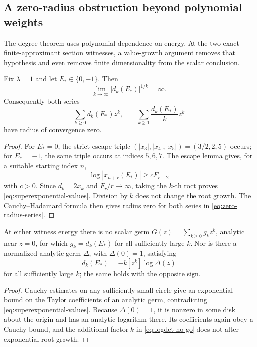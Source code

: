 \subsection{A zero-radius obstruction beyond polynomial weights}

The degree theorem uses polynomial dependence on energy.  At the two exact
finite-approximant section witnesses, a value-growth argument removes that
hypothesis and even
removes finite dimensionality from the scalar conclusion.

\begin{theorem}
Fix \(\lambda=1\) and let \(E_*\in\{0,-1\}\).  Then
\begin{equation}
\lim_{k\to\infty}|d_k(E_*)|^{1/k}=\infty.
\label{eq:superexponential-values}
\end{equation}
Consequently both series
\begin{equation}
\sum_{k\ge0}d_k(E_*)z^k,
\qquad
\sum_{k\ge1}\frac{d_k(E_*)}{k}z^k
\label{eq:zero-radius-series}
\end{equation}
have radius of convergence zero.
\end{theorem}

\begin{proof}
For \(E_*=0\), the strict escape triple
\((|x_3|,|x_4|,|x_5|)=(3/2,2,5)\) occurs; for \(E_*=-1\), the same triple
occurs at indices \(5,6,7\).  The escape lemma gives, for a suitable starting
index \(n\),
\[
\log|x_{n+r}(E_*)|\ge cF_{r+2}
\]
with \(c>0\).  Since \(d_k=2x_k\) and
\(F_r/r\to\infty\), taking the \(k\)-th root proves
\eqref{eq:superexponential-values}.  Division by \(k\) does not change the
root growth.  The Cauchy--Hadamard formula then gives radius zero for both
series in \eqref{eq:zero-radius-series}.
\end{proof}

\begin{corollary}
At either witness energy there is no scalar germ
\(G(z)=\sum_{k\ge0}g_kz^k\), analytic near \(z=0\), for which
\(g_k=d_k(E_*)\) for all sufficiently large \(k\).  Nor is there a normalized
analytic germ \(\Delta\), with \(\Delta(0)=1\), satisfying
\begin{equation}
d_k(E_*)=-k[z^k]\log\Delta(z)
\label{eq:logdet-no-go}
\end{equation}
for all sufficiently large \(k\); the same holds with the opposite sign.
\end{corollary}

\begin{proof}
Cauchy estimates on any sufficiently small circle give an exponential bound
on the Taylor coefficients of an analytic germ, contradicting
\eqref{eq:superexponential-values}.  Because \(\Delta(0)=1\), it is nonzero in
some disk about the origin and has an analytic logarithm there.  Its
coefficients again obey a Cauchy bound, and the additional factor \(k\) in
\eqref{eq:logdet-no-go} does not alter exponential root growth.
\end{proof}

